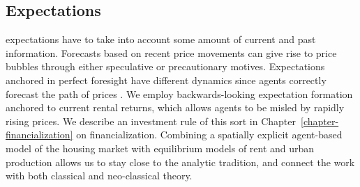 \subsection{Expectations}
\Glspl{expectation} have to take into account some amount of current and past information. Forecasts based on recent price movements can give rise to \glspl{price bubble} through either speculative or precautionary motives. Expectations anchored in \gls{perfect foresight} have different dynamics since agents correctly forecast the path of prices \cite{muthRationalExpectationsTheory1961}. We employ backwards-looking expectation formation anchored 
to current rental returns, which allows agents to be misled by rapidly rising prices. We describe an investment rule of this sort in Chapter~\ref{chapter-financialization} on financialization. 
Combining a spatially explicit agent-based model of the housing market with equilibrium models of rent and urban production allows us to stay close to the analytic tradition, and connect the work with both classical and neo-classical theory. 










